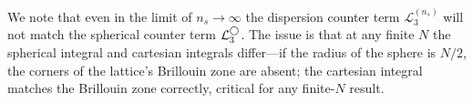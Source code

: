 We note that even in the limit of $n_s \to \infty$ the dispersion counter term $\mathcal{L}^{(n_s)}_3$ will not match the spherical counter term $\mathcal{L}^{\bigcirc}_3$.
The issue is that at any finite $N$ the spherical integral and cartesian integrals differ---if the radius of the sphere is $N/2$, the corners of the lattice's Brillouin zone are absent; the cartesian integral matches the Brillouin zone correctly, critical for any finite-$N$ result.

